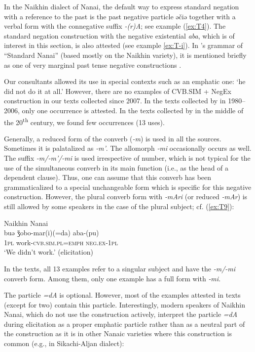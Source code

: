 \documentclass[output=paper]{langscibook}
\begin{document}
In the Naikhin dialect of Nanai, the default way to express standard negation with a reference to the past is the past negative particle əčiə together with a verbal form with the connegative suffix \textit{-(r)A}; see example (\ref{ex:T4}). The standard negation construction with the negative existential \textit{aba}, which is of interest in this section, is also attested (see example \ref{ex:T-i}). In \citeauthor{avrorin1961a}’s grammar of “Standard Nanai” (based mostly on the Naikhin variety), it is mentioned briefly as one of very marginal past tense negative constructions \citeyearpar[108]{avrorin1961a}.

Our consultants allowed its use in special contexts such as an emphatic one: ‘he did not do it at all.’ However, there are no examples of CVB.SIM + NegEx construction in our texts collected since 2007. In the texts collected by \citet{beljdy2012a} in 1980–2006, only one occurrence is attested. In the texts collected by \citet{avrorin1986a} in the middle of the 20\textsuperscript{th} century, we found few occurrences (13 uses).

Generally, a reduced form of the converb (\textit{-m}) is used in all the sources. Sometimes it is palatalized as \textit{‑m'}. The allomorph \textit{‑mi} occasionally occurs as well. The suffix \textit{-m/-m'/-mi} is used irrespective of number, which is not typical for the use of the simultaneous converb in its main function (i.e., as the head of a dependent clause). Thus, one can assume that this converb has been grammaticalized to a special unchangeable form which is specific for this negative construction. However, the plural converb form with \textit{‑mAri} (or reduced \textit{‑mAr}) is still allowed by some speakers in the case of the plural subject; cf. (\ref{ex:T9}):

\ea Naikhin Nanai \label{ex:T9}\\
	\gll buə	ǯobo-mar(i)(=da)	aba-(pu)\\
	\textsc{1pl}	work-\textsc{cvb.sim.pl=emph}	\textsc{neg.ex-1pl}\\
	\glt `We didn’t work.' (elicitation)
\z

In the texts, all 13 examples refer to a singular subject and have the \textit{-m/-mi} converb form. Among them, only one example has a full form with \textit{‑mi}.

The particle \textit{=dA} is optional. However, most of the examples attested in texts (except for two) contain this particle. Interestingly, modern speakers of Naikhin Nanai, which do not use the construction actively, interpret the particle \textit{=dA} during elicitation as a proper emphatic particle rather than as a neutral part of the construction as it is in other Nanaic varieties where this construction is common (e.g., in Sikachi-Aljan dialect):
\end{document}
